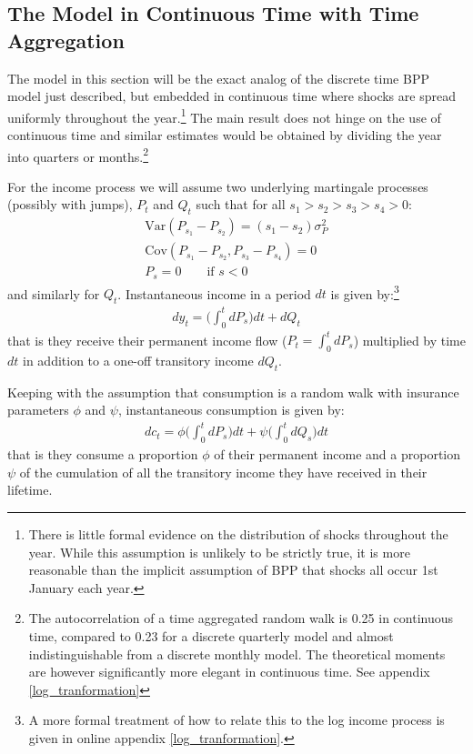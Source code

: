 \documentclass[AER]{AEA}
\begin{document}
\subsection{The Model in Continuous Time with Time Aggregation}
The model in this section will be the exact analog of the discrete time BPP model just described, but embedded in continuous time where shocks are spread uniformly throughout the year.\footnote{There is little formal evidence on the distribution of shocks throughout the year. While this assumption is unlikely to be strictly true, it is more reasonable than the implicit assumption of BPP that shocks all occur 1st January each year.} The main result does not hinge on the use of continuous time and similar estimates would be obtained by dividing the year into quarters or months.\footnote{The autocorrelation of a time aggregated random walk is 0.25 in continuous time, compared to 0.23 for a discrete quarterly model and almost indistinguishable from a discrete monthly model. The theoretical moments are however significantly more elegant in continuous time. See appendix \ref{log_tranformation}}

For the income process we will assume two underlying martingale processes (possibly with jumps), $P_t$ and $Q_t$ such that for all $s_1>s_2>s_3>s_4>0$:
\begin{align*}
\mathrm{Var}(P_{s_1}-P_{s_2})=(s_1-s_2)\sigma_P^2 \\
\mathrm{Cov}(P_{s_1}-P_{s_2},P_{s_3}-P_{s_4}) = 0 \\
P_s = 0 \qquad \text{if } s<0
\end{align*}
and similarly for $Q_t$.  Instantaneous income in a period $dt$ is given by:\footnote{A more formal treatment of how to relate this to the log income process is given in online appendix \ref{log_tranformation}.}
\begin{align}
dy_t = \Big( \int_{0}^{t}dP_s \Big) dt  +dQ_t \label{income_process}
\end{align}
that is they receive their permanent income flow ($P_t =\int_{0}^{t}dP_s $) multiplied by time $dt$ in addition to a one-off transitory income $dQ_t$.

Keeping with the assumption that consumption is a random walk with insurance parameters $\phi$ and $\psi$, instantaneous consumption is given by:
\begin{align}
dc_t = \phi \Big( \int_{0}^{t} dP_s  \Big) dt +\psi\Big( \int_{0}^{t}dQ_s\Big) dt  \label{consumption_process}
\end{align}
that is they consume a proportion $\phi$ of their permanent income and a proportion $\psi$ of the cumulation of all the transitory income they have received in their lifetime.
\end{document}
